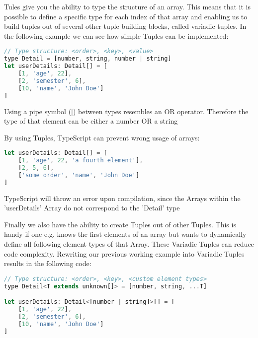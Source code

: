 \documentclass[english,runningheads, letterpaper]{llncs}[2018/03/10]
\begin{document}
Tules give you the ability to type the structure of an array. This
means that it is possible to define a specific type for each index
of that array and enabling us to build tuples out of several other
tuple building blocks, called variadic tuples. In the following example
we can see how simple Tuples can be implemented:

\begin{lstlisting}[style=ES6, language=JavaScript, caption="Tuple usage"]
// Type structure: <order>, <key>, <value>
type Detail = [number, string, number | string]
let userDetails: Detail[] = [
	[1, 'age', 22],
	[2, 'semester', 6],
	[10, 'name', 'John Doe']
]
\end{lstlisting}

\begin{note}
Using a pipe symbol (|) between types resembles an OR operator. Therefore
the type of that element can be either a number OR a string
\end{note}

By using Tuples, TypeScript can prevent wrong usage of arrays:

\begin{lstlisting}[style=ES6, language=JavaScript, caption="Problematic Tuple usage"]
let userDetails: Detail[] = [
	[1, 'age', 22, 'a fourth element'],
	[2, 5, 6],
	['some order', 'name', 'John Doe']
]
\end{lstlisting}

\begin{problem}
TypeScript will throw an error upon compilation, since the Arrays
within the 'userDetails' Array do not correspond to the 'Detail' type
\end{problem}

Finally we also have the ability to create Tuples out of other Tuples.
This is handy if one e.g. knows the first elements of an array but
wants to dynamically define all following element types of that Array.
These Variadic Tuples can reduce code complexity. Rewriting our previous
working example into Variadic Tuples results in the following code:

\begin{lstlisting}[style=ES6, language=JavaScript, caption="Variadic Tuples"]
// Type structure: <order>, <key>, <custom element types>
type Detail<T extends unknown[]> = [number, string, ...T]

let userDetails: Detail<[number | string]>[] = [
	[1, 'age', 22],
	[2, 'semester', 6],
	[10, 'name', 'John Doe']
]
\end{lstlisting}
\end{document}
